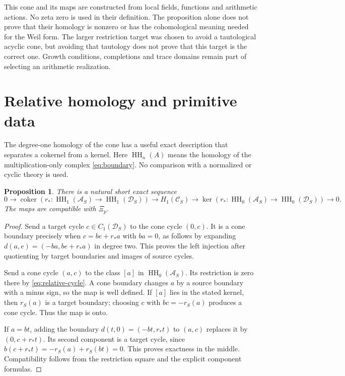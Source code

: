 \documentclass[11pt,letterpaper]{article}
\newtheorem{proposition}[theorem]{Proposition}
\theoremstyle{definition}
\theoremstyle{remark}
\newcommand{\Acal}{\mathcal A}
\newcommand{\HH}{\operatorname{HH}}
\begin{document}
This cone and its maps are constructed from local fields, functions
and arithmetic actions. No zeta zero is used in their definition.
The proposition alone does not prove that their homology is nonzero
or has the cohomological meaning needed for the Weil form.
The larger restriction target was chosen to avoid a tautological
acyclic cone, but avoiding that tautology does not prove that this
target is the correct one. Growth conditions, completions and trace
domains remain part of selecting an arithmetic realization.

\section{Relative homology and primitive data}

The degree-one homology of the cone has a useful exact description
that separates a cokernel from a kernel. Here $\HH_n(A)$ means the
homology of the multiplication-only complex \eqref{eq:boundary}.
No comparison with a normalized or cyclic theory is used.

\begin{proposition}\label{prop:cone-exact}
There is a natural short exact sequence
\begin{equation}
 0\longrightarrow\operatorname{coker}(r_*:\HH_1(\Acal_S)\to\HH_1(\mathscr D_S))
 \longrightarrow H_1(\mathscr C_S)
 \longrightarrow\ker(r_*:\HH_0(\Acal_S)\to\HH_0(\mathscr D_S))
 \longrightarrow0.
 \label{eq:cone-exact}
\end{equation}
The maps are compatible with $\Xi_p$.
\end{proposition}
\begin{proof}
Send a target cycle $c\in C_1(\mathscr D_S)$ to the cone cycle
$(0,c)$. It is a cone boundary precisely when
$c=be+r_*a$ with $ba=0$, as follows by expanding
$d(a,e)=(-ba,be+r_*a)$ in degree two. This proves the left
injection after quotienting by target boundaries and images of
source cycles.

Send a cone cycle $(a,c)$ to the class $[a]$ in $\HH_0(\Acal_S)$.
Its restriction is zero there by \eqref{eq:relative-cycle}.
A cone boundary changes $a$ by a source boundary with a minus
sign, so the map is well defined. If $[a]$ lies in the stated
kernel, then $r_S(a)$ is a target boundary; choosing $c$ with
$bc=-r_S(a)$ produces a cone cycle. Thus the map is onto.

If $a=bt$, adding the boundary $d(t,0)=(-bt,r_*t)$ to
$(a,c)$ replaces it by $(0,c+r_*t)$. Its second component is a
target cycle, since $b(c+r_*t)=-r_S(a)+r_S(bt)=0$.
This proves exactness in the middle. Compatibility follows from
the restriction square and the explicit component formulas.
\end{proof}
\end{document}
